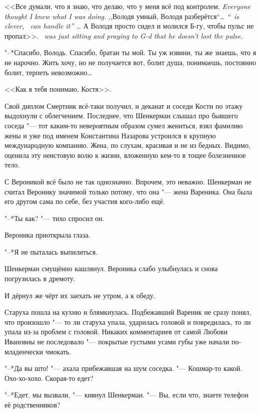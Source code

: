{<<Все думали, что я знаю, что делаю, что у меня всё под контролем.}
{\textit{Everyone thought I knew what I was doing.}}
{,,Володя умный, Володя разберётся``\ldots{}}
{\textit{``\Volodya\ is clever, \Volodya\ can handle it'' \ldots{}}}
{А Володя просто сидел и молился Б-гу, чтобы пульс не пропал>>.}
{\textit{\Volodya\ was just sitting and praying to G-d that he doesn't lost the pulse.}}

"--*Спасибо, Володь.
Спасибо, братан ты мой.
Ты уж извини, ты же знаешь, что я не нарочно.
Жить хочу, но не получается вот, болит душа, понимаешь, постоянно болит, терпеть невозможно\ldots{}

<<Как я тебя понимаю, Костя>>.

Свой диплом Смертник всё-таки получил, и деканат и соседи Кости по этажу выдохнули с облегчением.
Последнее, что Шенкерман слышал про бывшего соседа "--- тот каким-то невероятным образом сумел жениться, взял фамилию жены и уже под именем Константина Назарова устроился в крупную международную компанию.
Жена, по слухам, красивая и не из бедных.
Видимо, оценила эту неистовую волю к жизни, вложенную кем-то в тощее болезненное тело.

С Вероникой всё было не так однозначно.
Впрочем, это неважно.
Шенкерман не считал Веронику значимой только потому, что она "--- жена Вареника.
Она была его другом сама по себе, без участия кого-либо ещё.

"--*Ты как? "--- тихо спросил он.

Вероника приоткрыла глаза.

"--*Я не пыталась выпилиться.

Шенкерман смущённо кашлянул.
Вероника слабо улыбнулась и снова погрузилась в дремоту.

\asterism

И дёрнул же чёрт их заехать не утром, а к обеду.

Старуха пошла на кухню и блямкнулась.
Подбежавший Вареник не сразу понял, что произошло "--- то ли старуха упала, ударилась головой и повредилась, то ли упала из-за проблем с головой.
Никаких комментариев от самой Любови Ивановны не последовало "--- покрытые густыми усами губы уже начали по-младенчески чмокать.

"--*Да вы што! "--- ахала прибежавшая на шум соседка.
"--- Кошмар-то какой.
Охо-хо-хохо.
Скорая-то едет?

"--*Едет, мы вызвали, "--- кивнул Шенкерман.
"--- Вы, если что, знаете телефон её родственников?

